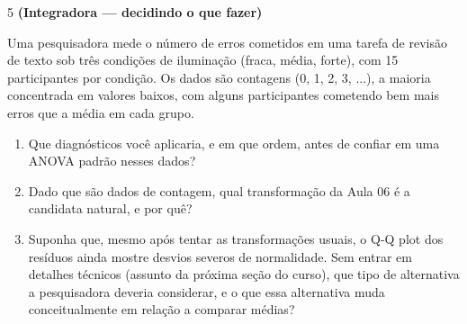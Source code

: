 \documentclass[11pt]{article}
\begin{document}
\begin{questao}{5} \textbf{(Integradora --- decidindo o que fazer)}

Uma pesquisadora mede o número de erros cometidos em uma tarefa de revisão de texto sob três
condições de iluminação (fraca, média, forte), com 15 participantes por condição. Os dados são
contagens (0, 1, 2, 3, ...), a maioria concentrada em valores baixos, com alguns participantes
cometendo bem mais erros que a média em cada grupo.

\begin{enumerate}[label=(\alph*)]
  \item Que diagnósticos você aplicaria, e em que ordem, antes de confiar em uma ANOVA padrão
    nesses dados?
  \item Dado que são dados de contagem, qual transformação da Aula 06 é a candidata natural, e
    por quê?
  \item Suponha que, mesmo após tentar as transformações usuais, o Q-Q plot dos resíduos ainda
    mostre desvios severos de normalidade. Sem entrar em detalhes técnicos (assunto da próxima
    seção do curso), que tipo de alternativa a pesquisadora deveria considerar, e o que essa
    alternativa muda conceitualmente em relação a comparar médias?
\end{enumerate}
\end{questao}
\end{document}
